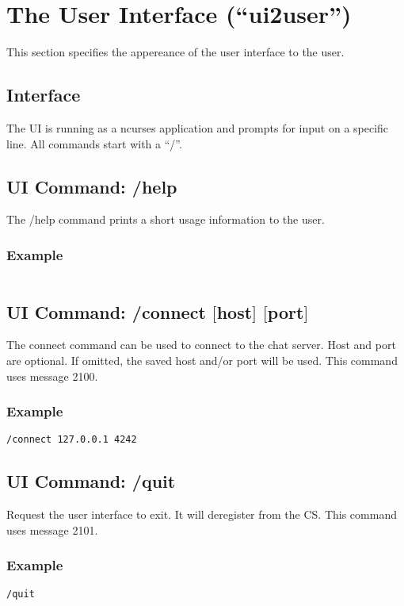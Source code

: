 \section{The User Interface ("`ui2user"')}
This section specifies the appereance of the user interface to the user.
\subsection{Interface}
The UI is running as a ncurses application and prompts for input
on a specific line.
All commands start with a "`/"'.
\subsection{UI Command: /help}
The /help command prints a short usage information to the user.

\subsubsection{Example}
\begin{verbatim}
\end{verbatim}

\subsection{UI Command: /connect $[$host$]$ $[$port$]$}
The connect command can be used to connect to the chat server.
Host and port are optional. If omitted, the saved host and/or
port will be used. This command uses message 2100.
\subsubsection{Example}
\begin{verbatim}
/connect 127.0.0.1 4242
\end{verbatim}
\subsection{UI Command: /quit}
Request the user interface to exit. It will deregister from the CS.
This command uses message 2101.
\subsubsection{Example}
\begin{verbatim}
/quit
\end{verbatim}

